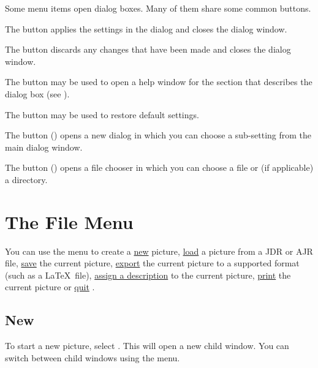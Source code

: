 Some menu items open dialog boxes. Many of them share some common
buttons.


The  button applies the settings in the dialog and
closes the dialog window.


The  button discards any changes that have been made
and closes the dialog window.


The  button may be used to open a help
window for the section that describes the dialog box (see
).


The  button may be used to restore default
settings.


The  button () opens a new dialog in which you
can choose a sub-setting from the main dialog window.


The  button () opens a file chooser in
which you can choose a file or (if applicable) a directory.

\chapter{The File Menu}\label{sec:filemenu}


You can use the  menu to create a
\hyperref[sec:newimage]{new} picture,
\hyperref[sec:loadimage]{load} a picture from a
\gls{JDR} or \gls{AJR} file,
\hyperref[sec:saveimage]{save} the current picture,
\hyperref[sec:exportimage]{export} the current
picture to a supported format (such as a \LaTeX\ file),
\hyperref[sec:imagedescription]{assign a description} to the
current picture, \hyperref[sec:print]{print} the
current picture or \hyperref[sec:quit]{quit} \FlowframTk.

\section{New}\label{sec:newimage}


To start a new picture, select . This will open
a new child window. You can switch between child windows using the
 menu.

